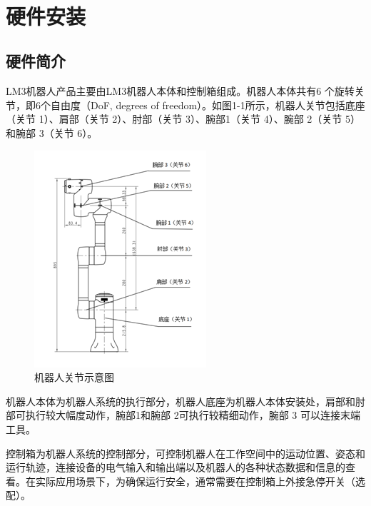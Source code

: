 

 
\section{硬件安装}
\subsection{硬件简介}
 LM3机器人产品主要由LM3机器人本体和控制箱组成。机器人本体共有6 个旋转关节，即6个自由度（DoF, degrees of freedom）。如图1-1所示，机器人关节包括底座（关节 1）、肩部（关节 2）、肘部（关节 3）、腕部1（关节 4）、腕部 2（关节 5）和腕部 3（关节 6）。

\begin{figure}[ht]
    \centering
    \includegraphics{image/1-1-joints.png}
    \caption{机器人关节示意图}
\end{figure}

机器人本体为机器人系统的执行部分，机器人底座为机器人本体安装处，肩部和肘部可执行较大幅度动作，腕部1和腕部 2可执行较精细动作，腕部 3 可以连接末端工具。

控制箱为机器人系统的控制部分，可控制机器人在工作空间中的运动位置、姿态和运行轨迹，连接设备的电气输入和输出端以及机器人的各种状态数据和信息的查看。在实际应用场景下，为确保运行安全，通常需要在控制箱上外接急停开关（选配）。

